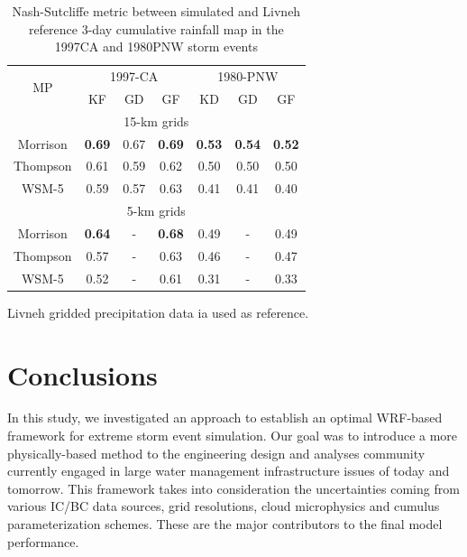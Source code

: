 \begin{table}[htbp]
	\centering
	\caption{Nash-Sutcliffe metric between simulated and Livneh reference 3-day cumulative rainfall map in the 1997CA and 1980PNW storm events}
	\begin{threeparttable}
		\begin{tabular}{ccccccc}
			\hline
			\multirow{2}{*}{MP} & \multicolumn{3}{c}{1997-CA} & \multicolumn{3}{c}{1980-PNW} \\
			\cline{2-7}
			& KF & GD & GF & KD & GD & GF\\
			\hline
			\multicolumn{7}{c}{15-km grids}\\
			Morrison & \textbf{0.69} & 0.67 & \textbf{0.69} & \textbf{0.53} & \textbf{0.54} & \textbf{0.52}\\
			Thompson & 0.61 & 0.59 & 0.62 & 0.50 & 0.50 & 0.50\\
			WSM-5 & 0.59 & 0.57 & 0.63 & 0.41 & 0.41 & 0.40\\
			\hline
			\multicolumn{7}{c}{5-km grids}\\
			Morrison & \textbf{0.64} & - & \textbf{0.68} & 0.49 & - & 0.49\\
			Thompson & 0.57 & - & 0.63 & 0.46 & - & 0.47\\
			WSM-5 & 0.52 & - & 0.61 & 0.31 & - & 0.33\\
			\hline
			\end{tabular}
		\begin{tablenotes}
			\small
			\item Livneh gridded precipitation data ia used as reference.
		\end{tablenotes}
	\end{threeparttable}
	\label{table:2-6}
\end{table}

\section{Conclusions}

In this study, we investigated an approach to establish an optimal WRF-based framework for extreme storm event simulation. Our goal was to introduce a more physically-based method to the engineering design and analyses community currently engaged in large water management infrastructure issues of today and tomorrow. This framework takes into consideration the uncertainties coming from various IC/BC data sources, grid resolutions, cloud microphysics and cumulus parameterization schemes. These are the major contributors to the final model performance.

